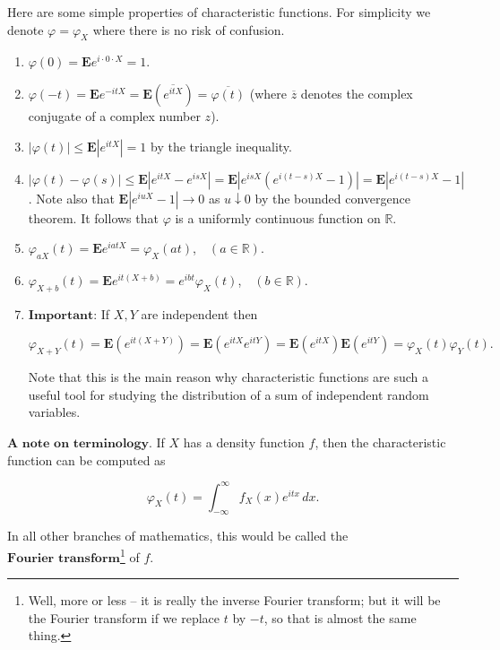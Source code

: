 \documentclass[11pt]{report}
\newcommand{\R}{\mathbb{R}}
\theoremstyle{plain}
\theoremstyle{definition}
\begin{document}
Here are some simple properties of characteristic
functions. For simplicity we denote
$\varphi = \varphi_X$ where there is no risk of
confusion.

\begin{enumerate}[label=\arabic*.]
\item $\varphi(0) = \mathbf{E} e^{i\cdot 0\cdot X} = 1$.

\item $\varphi(-t) = \mathbf{E} e^{-i t X} = \mathbf{E}
\left(\overline{e^{it X}}\right) =
\overline{\varphi(t)}$
(where $\overline{z}$ denotes the complex conjugate
of a complex number $z$).

\item $|\varphi(t)| \le \mathbf{E}\left|e^{i t X}\right| =
1$
by the triangle inequality.

\item $|\varphi(t)-\varphi(s)| \le \mathbf{E} \left| e^{i t
X} - e^{isX}\right| = \mathbf{E} \left|e^{i s X}
\left(e^{i(t-s)X}-1\right)\right| = \mathbf{E} \left|
e^{i(t-s)X}-1\right|$.
Note also that
$\mathbf{E} \left|e^{i u X}-1\right|\to 0$ as
$u \downarrow 0$ by the bounded convergence theorem.
It follows that $\varphi$ is a uniformly continuous
function on $\R$.

\item $\varphi_{a X}(t) = \mathbf{E} e^{i a t X} =
\varphi_X(a t)$,\
\ $(a\in\R)$.

\item $\varphi_{X+b}(t) = \mathbf{E} e^{i t (X+b)} = e^{i b
t} \varphi_X(t)$,\
\ $(b\in\R)$.

\item $\textbf{Important:}$ If $X,Y$ are independent then

\[
\varphi_{X+Y}(t) = \mathbf{E}\left(e^{it(X+Y)}\right)
= \mathbf{E}\left(e^{itX} e^{itY}\right) = \mathbf{E}\left(e^{itX}\right) \mathbf{E} \left(e^{itY}\right) = \varphi_X(t) \varphi_Y(t).
\]

\noindent Note that this is the main reason why characteristic
functions are such a useful tool for studying the
distribution of a sum of independent random variables.
\end{enumerate}

\noindent $\textbf{A note on terminology.}$ If $X$ has a
density function $f$, then the characteristic
function can be computed as

\[
\varphi_X(t) = \int_{-\infty}^\infty f_X(x) e^{itx}\,dx.
\]

\noindent In all other branches of mathematics, this would be
called the
$\textbf{Fourier transform}$\footnote{Well, more or less -- it is really the inverse
Fourier transform; but it will be the Fourier
transform if we replace $t$ by $-t$, so that is
almost the same thing.}
of $f$.
\end{document}
